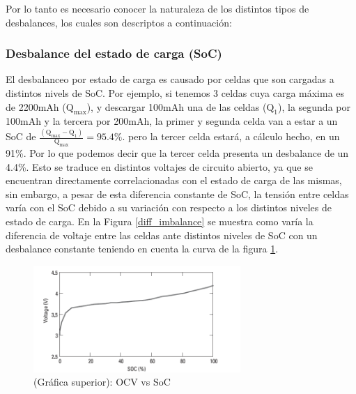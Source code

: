 \documentclass[10pt,a4paper]{article}
\begin{document}
	\noindent Por lo tanto es necesario conocer la naturaleza de los distintos 
    tipos de desbalances, los cuales son descriptos a continuación:
	
	\subsubsection{Desbalance del estado de carga (SoC)}
	
	\noindent El desbalanceo por estado de carga es causado por celdas que son 
    cargadas a distintos nivels de SoC. Por ejemplo, si tenemos 3 celdas cuya 
    carga máxima es de 2200mAh ($\mathrm{Q_{max}}$), y descargar 100mAh una de 
    las celdas ($\mathrm{Q_1}$), la segunda por 100mAh y la tercera por 200mAh, 
    la primer y segunda celda van a estar a un SoC de 
    $\mathrm{\frac{(Q_{max} - Q_1)}{Q_{max}} = 95.4\%}$. pero la tercer celda 
    estará, a cálculo hecho, en un 91\%. Por lo que podemos decir que la tercer 
    celda presenta un desbalance de un 4.4\%. Esto se traduce en distintos 
    voltajes de circuito abierto, ya que se encuentran directamente 
    correlacionadas con el estado de carga de las mismas, sin embargo, a pesar 
    de esta diferencia constante de SoC, la tensión entre celdas varía con el 
    SoC debido a su variación con respecto a los distintos niveles de estado de 
    carga. En la Figura \ref{diff_imbalance} se muestra como varía la diferencia 
    de voltaje entre las celdas ante distintos niveles de SoC con un desbalance 
    constante teniendo en cuenta la curva de la figura 
    \ref{OCV_SoC_equalization_figure}.
	
	\begin{figure}[h!]
		\begin{center}
			\includegraphics[width=0.7\textwidth]{SoC_vs_OCV_equalization.png}
			\caption{(Gráfica superior): OCV vs SoC}
			\label{OCV_SoC_equalization_figure}
		\end{center}
	\end{figure}
	
\end{document}
